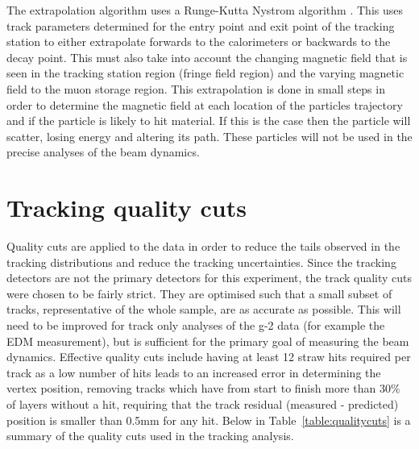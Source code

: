 The extrapolation algorithm uses a Runge-Kutta Nystrom algorithm \cite{rungekutta1}\cite{rungekutta2}. 
This uses track parameters determined for the entry point and exit point of the tracking station to either extrapolate forwards to the calorimeters or backwards to the decay point. This must also take into account the changing magnetic field that is seen in the tracking station region (fringe field region) and the varying magnetic field to the muon storage region. This extrapolation is done in small steps in order to determine the magnetic field at each location of the particles trajectory and if the particle is likely to hit material. If this is the case then the particle will scatter, losing energy and altering its path. These particles will not be used in the precise analyses of the beam dynamics.

\section{Tracking quality cuts}

Quality cuts are applied to the data in order to reduce the tails observed in the tracking distributions and reduce the tracking uncertainties. Since the tracking detectors are not the primary detectors for this experiment, the track quality cuts were chosen to be fairly strict. They are optimised such that a small subset of tracks, representative of the whole sample, are as accurate as possible. This will need to be improved for track only analyses of the g-2 data (for example the EDM measurement), but is sufficient for the primary goal of measuring the beam dynamics. Effective quality cuts include having at least 12 straw hits required per track as a low number of hits leads to an increased error in determining the vertex position, removing tracks which have from start to finish more than 30$\%$ of layers without a hit, requiring that the track residual (measured - predicted) position is smaller than 0.5mm for any hit. Below in Table~\ref{table:qualitycuts} is a summary of the quality cuts used in the tracking analysis.

